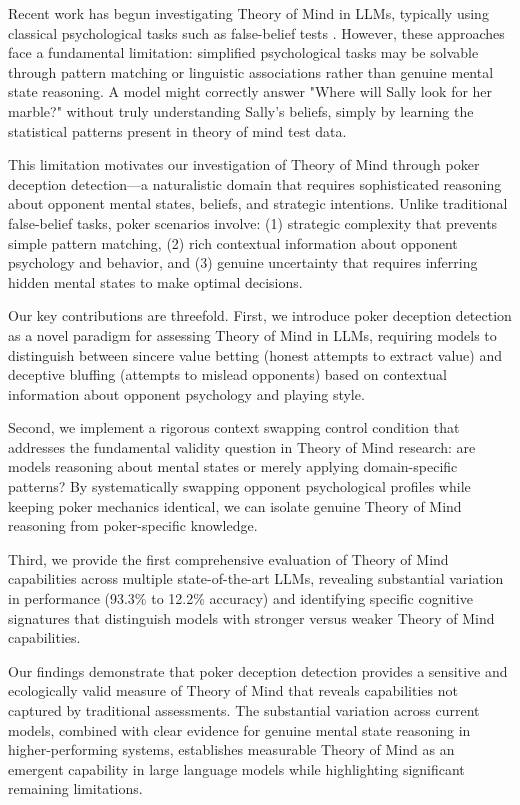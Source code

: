 \documentclass[11pt,a4paper]{article}
\begin{document}
Recent work has begun investigating Theory of Mind in LLMs, typically using classical psychological tasks such as false-belief tests \cite{ullman2023large, kosinski2023theory}. However, these approaches face a fundamental limitation: simplified psychological tasks may be solvable through pattern matching or linguistic associations rather than genuine mental state reasoning. A model might correctly answer "Where will Sally look for her marble?" without truly understanding Sally's beliefs, simply by learning the statistical patterns present in theory of mind test data.

This limitation motivates our investigation of Theory of Mind through poker deception detection—a naturalistic domain that requires sophisticated reasoning about opponent mental states, beliefs, and strategic intentions. Unlike traditional false-belief tasks, poker scenarios involve: (1) strategic complexity that prevents simple pattern matching, (2) rich contextual information about opponent psychology and behavior, and (3) genuine uncertainty that requires inferring hidden mental states to make optimal decisions.

Our key contributions are threefold. First, we introduce poker deception detection as a novel paradigm for assessing Theory of Mind in LLMs, requiring models to distinguish between sincere value betting (honest attempts to extract value) and deceptive bluffing (attempts to mislead opponents) based on contextual information about opponent psychology and playing style.

Second, we implement a rigorous context swapping control condition that addresses the fundamental validity question in Theory of Mind research: are models reasoning about mental states or merely applying domain-specific patterns? By systematically swapping opponent psychological profiles while keeping poker mechanics identical, we can isolate genuine Theory of Mind reasoning from poker-specific knowledge.

Third, we provide the first comprehensive evaluation of Theory of Mind capabilities across multiple state-of-the-art LLMs, revealing substantial variation in performance (93.3\% to 12.2\% accuracy) and identifying specific cognitive signatures that distinguish models with stronger versus weaker Theory of Mind capabilities.

Our findings demonstrate that poker deception detection provides a sensitive and ecologically valid measure of Theory of Mind that reveals capabilities not captured by traditional assessments. The substantial variation across current models, combined with clear evidence for genuine mental state reasoning in higher-performing systems, establishes measurable Theory of Mind as an emergent capability in large language models while highlighting significant remaining limitations.
\end{document}
